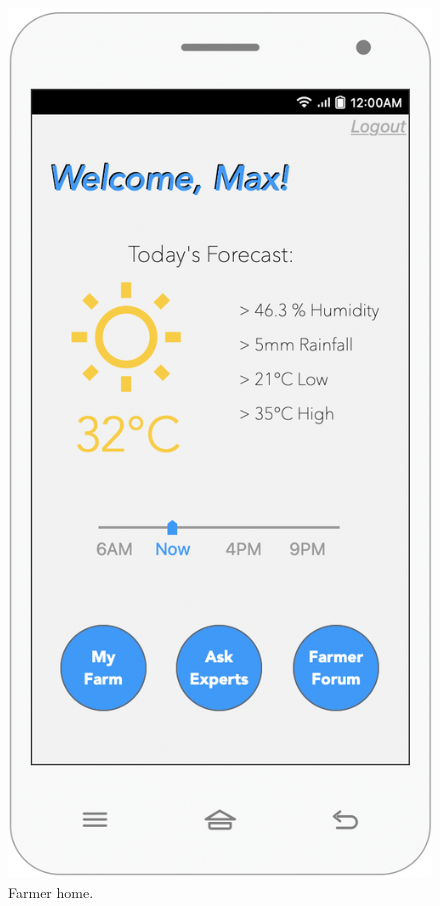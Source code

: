 \begin{multicols}{3}
\begin{figure}[H]
\centering
\includegraphics[scale=0.35]{../images_diagrams/mock_ups/welcomefarmer100.png}
\caption{\label{fig:mock_farmer}Farmer home.}
\end{figure}
\end{multicols}

